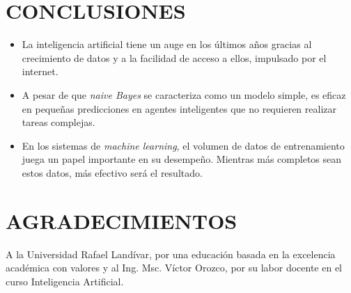 \documentclass[sigconf]{acmart}
\begin{document}



\section{CONCLUSIONES}
\begin{itemize}
    \item La inteligencia artificial tiene un auge en los últimos años gracias al crecimiento de datos y a la facilidad de acceso a ellos, impulsado por el internet.
    \item A pesar de que {\itshape naive Bayes} se caracteriza como un modelo simple, es eficaz en pequeñas predicciones en agentes inteligentes que no requieren realizar tareas complejas.
    \item En los sistemas de {\itshape machine learning}, el volumen de datos de entrenamiento juega un papel importante en su desempeño. Mientras más completos sean estos datos, más efectivo será el resultado.
\end{itemize}

\section{AGRADECIMIENTOS}
A la Universidad Rafael Landívar, por una educación basada en la excelencia académica con valores y al Ing. Msc. Víctor Orozco, por su labor docente en el curso Inteligencia Artificial.
\end{document}
